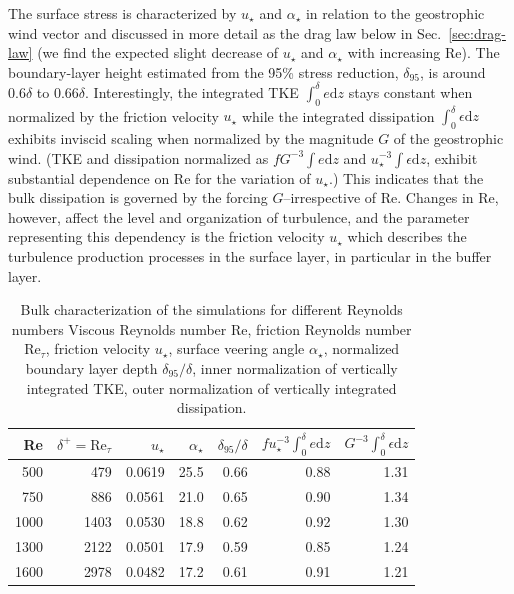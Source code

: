 \documentclass[smallcondensed,final]{svjour3}
\newcommand{\RE}{\mathrm{Re}}
\begin{document}
%
The surface stress is characterized by $u_\star$ and $\alpha_\star$ in relation to the geostrophic wind vector
and discussed in more detail as the drag law below in Sec.~\ref{sec:drag-law}
(we find the expected slight decrease of $u_\star$ and $\alpha_\star$ with increasing $\RE$).
%
The boundary-layer height estimated from the 95\% stress reduction, $\delta_{95}$, is around $0.6\delta$ to $0.66\delta$. 
%
Interestingly, the integrated TKE $\int_{0}^{\delta} e\mathrm{d}z$ stays constant when normalized by the friction velocity $u_\star$
while the integrated dissipation $\int_{0}^{\delta} \epsilon\mathrm{d}z$ exhibits inviscid scaling when normalized
by the magnitude $G$ of the geostrophic wind. 
%
(TKE and dissipation normalized as
$f G^{-3} \int e \mathrm{d} z$ and $u_\star^{-3} \int \epsilon\mathrm{d}z$, exhibit substantial
dependence on $\RE$ for the variation of $u_\star$.)
%
This indicates that the bulk dissipation is governed by the forcing $G$--irrespective of $\RE$. 
%
Changes in $\RE$, however, affect the level and organization of turbulence, and the parameter
representing this dependency is the friction velocity $u_\star$ which describes the turbulence
production processes in the surface layer, in particular in the buffer layer. 
% 
\begin{table}
  \caption{Bulk characterization of the simulations for different Reynolds numbers 
    Viscous Reynolds number $\RE$,
    friction Reynolds number  $\RE_\tau$,
    friction velocity $u_\star$,
    surface veering angle $\alpha_\star$,
    normalized boundary layer depth $\delta_{95}/\delta$, 
    inner normalization of vertically integrated TKE, 
    outer normalization of vertically integrated dissipation.
    \label{tab:bulk_results}}
  \centering\begin{tabular}{r r r r r r r }
      \toprule
      Re & $\delta^+=\RE_\tau$& $u_\star$ & $\alpha_\star$ & $\delta_{95}/\delta$ & $f u_\star^{-3}\int_{0}^{\delta} e \mathrm{d} z $ & $ G^{-3}\int_{0}^{\delta} \epsilon \mathrm{d}z$\\
      \midrule 
      \rowcolor{gray!30} 
      500 & 479 & 0.0619& 25.5 & 0.66& 0.88& 1.31 \\
      \rowcolor{gray!30} 
      750 & 886 & 0.0561& 21.0 & 0.65& 0.90& 1.34 \\
      \rowcolor{gray!30}
      1000& 1403& 0.0530& 18.8 & 0.62& 0.92& 1.30 \\
      \midrule
      1300& 2122& 0.0501& 17.9 & 0.59& 0.85& 1.24 \\
      1600& 2978& 0.0482& 17.2 & 0.61& 0.91& 1.21 \\ 
      \bottomrule
  \end{tabular}
\end{table} 
\end{document}

